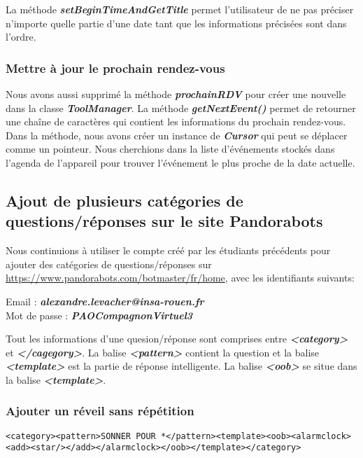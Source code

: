 \indent La méthode \textbf{\emph{setBeginTimeAndGetTitle}} permet l'utilisateur de ne pas préciser n'importe quelle partie d'une date tant que les informations précisées sont dans l'ordre.

\subsubsection*{Mettre à jour le prochain rendez-vous}

\indent Nous avons aussi supprimé la méthode \textbf{\emph{prochainRDV}} pour créer une nouvelle dans la classe \textbf{\emph{ToolManager}}. La méthode \textbf{\emph{getNextEvent()}} permet de retourner une chaîne de caractères qui contient les informations du prochain rendez-vous. Dans la méthode, nous avons créer un instance de \textbf{\emph{Cursor}} qui peut se déplacer comme un pointeur. Nous cherchions dans la liste d'événements stockés dans l'agenda de l'appareil pour trouver l'événement le plus proche de la date actuelle.

\subsection{Ajout de plusieurs catégories de questions/réponses sur le site Pandorabots}

\indent Nous continuions à utiliser le compte créé par les étudiants précédents pour ajouter des catégories de questions/réponses sur \url{https://www.pandorabots.com/botmaster/fr/home}, avec les identifiants suivants:

\begin{center}
	Email : \textbf{\emph{alexandre.levacher@insa-rouen.fr}}\\
	Mot de passe : \textbf{\emph{PAOCompagnonVirtuel3}}
\end{center}

\indent Tout les informations d'une quesion/réponse sont comprises entre \textbf{\emph{<category>}} et \textbf{\emph{</cagegory>}}. La balise \textbf{\emph{<pattern>}} contient la question et la balise \textbf{\emph{<template>}} est la partie de réponse intelligente. La balise \textbf{\emph{<oob>}} se situe dans la balise \textbf{\emph{<template>}}.

\subsubsection{Ajouter un réveil sans répétition}
\begin{lstlisting}[frame=none,aboveskip=0.5em]
<category><pattern>SONNER POUR *</pattern><template><oob><alarmclock>
<add><star/></add></alarmclock></oob></template></category>
\end{lstlisting}

